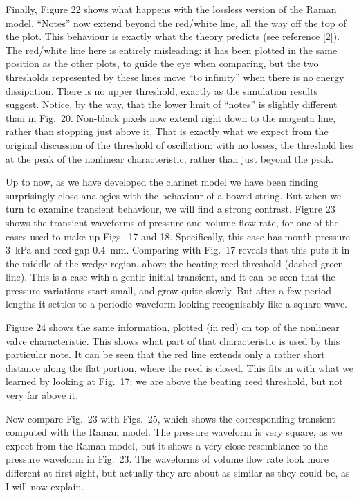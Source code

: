   Finally, Figure 22 shows what happens with the lossless version of the Raman 
  model. “Notes” now extend beyond the red/white line, all the way off the top 
  of the plot. This behaviour is exactly what the theory predicts (see 
  reference [2]). The red/white line here is entirely misleading: it has been 
  plotted in the same position as the other plots, to guide the eye when 
  comparing, but the two thresholds represented by these lines move “to 
  infinity” when there is no energy dissipation. There is no upper threshold, 
  exactly as the simulation results suggest. Notice, by the way, that the lower 
  limit of “notes” is slightly different than in Fig.\ 20. Non-black pixels now 
  extend right down to the magenta line, rather than stopping just above it. 
  That is exactly what we expect from the original discussion of the threshold 
  of oscillation: with no losses, the threshold lies at the peak of the 
  nonlinear characteristic, rather than just beyond the peak. 


  Up to now, as we have developed the clarinet model we have been finding 
  surprisingly close analogies with the behaviour of a bowed string. But when 
  we turn to examine transient behaviour, we will find a strong contrast. 
  Figure 23 shows the transient waveforms of pressure and volume flow rate, for 
  one of the cases used to make up Figs.\ 17 and 18. Specifically, this case 
  has mouth pressure 3~kPa and reed gap 0.4~mm. Comparing with Fig.\ 17 reveals 
  that this puts it in the middle of the wedge region, above the beating reed 
  threshold (dashed green line). This is a case with a gentle initial 
  transient, and it can be seen that the pressure variations start small, and 
  grow quite slowly. But after a few period-lengths it settles to a periodic 
  waveform looking recognisably like a square wave. 

  Figure 24 shows the same information, plotted (in red) on top of the 
  nonlinear valve characteristic. This shows what part of that characteristic 
  is used by this particular note. It can be seen that the red line extends 
  only a rather short distance along the flat portion, where the reed is 
  closed. This fits in with what we learned by looking at Fig.\ 17: we are 
  above the beating reed threshold, but not very far above it. 

  Now compare Fig.\ 23 with Figs.\ 25, which shows the corresponding transient 
  computed with the Raman model. The pressure waveform is very square, as we 
  expect from the Raman model, but it shows a very close resemblance to the 
  pressure waveform in Fig.\ 23. The waveforms of volume flow rate look more 
  different at first sight, but actually they are about as similar as they 
  could be, as I will now explain. 

